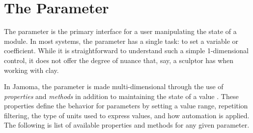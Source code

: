 \documentclass{article}
\begin{document}
\section{The Parameter} %
\label{sec:the_parameter}

The parameter is the primary interface for a user manipulating the state of a module. In most systems, the parameter has a single task: to set a variable or coefficient. While it is straightforward to understand such a simple 1-dimensional control, it does not offer the degree of nuance that, say, a sculptor has when working with clay.

In Jamoma, the parameter is made multi-dimensional through the use of \emph{properties} and \emph{methods} in addition to maintaining the state of a value \cite{Place:2008}. These properties define the behavior for parameters by setting a value range, repetition filtering, the type of units used to express values, and how automation is applied. The following is list of available properties and methods for any given parameter.

\end{document}
